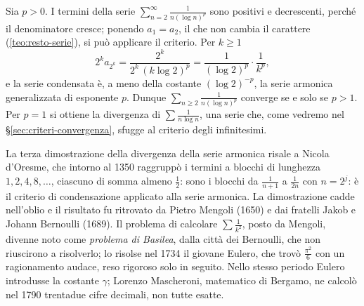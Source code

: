 \begin{esempio}\label{es:condensazione-log}
Sia $p>0$. I termini della serie $\sum_{n=2}^{\infty}\frac1{n(\log n)^{p}}$ sono positivi e
decrescenti, perché il denominatore cresce; ponendo $a_{1}=a_{2}$, il che non cambia il carattere (\cref{teo:resto-serie}),
si può applicare il criterio. Per $k\ge1$
\[
  2^{k}a_{2^{k}}=\frac{2^{k}}{2^{k}\,(k\log2)^{p}}=\frac1{(\log2)^{p}}\cdot\frac1{k^{p}} ,
\]
e la serie condensata è, a meno della costante $(\log2)^{-p}$, la serie armonica
generalizzata di esponente $p$. Dunque $\sum_{n\ge2}\frac1{n(\log n)^{p}}$ converge se e solo se
$p>1$. Per $p=1$ si ottiene la divergenza di $\sum\frac1{n\log n}$, una serie che, come
vedremo nel \S\ref{sec:criteri-convergenza}, sfugge al criterio degli infinitesimi.
\end{esempio}

\begin{notastorica}
La terza dimostrazione della divergenza della serie armonica risale a Nicola d'Oresme,
che intorno al 1350 raggruppò i termini a blocchi di lunghezza $1,2,4,8,\dots$, ciascuno di
somma almeno $\frac12$: sono i blocchi da $\frac1{n+1}$ a $\frac1{2n}$ con $n=2^{j}$: è il criterio di
condensazione applicato alla serie armonica. La dimostrazione cadde nell'oblio e il risultato fu ritrovato da Pietro
Mengoli (1650) e dai fratelli Jakob e Johann Bernoulli (1689). Il problema di calcolare
$\sum\frac1{k^{2}}$, posto da Mengoli, divenne noto come \emph{problema di Basilea}, dalla città
dei Bernoulli, che non riuscirono a risolverlo; lo risolse nel 1734 il giovane Eulero,
che trovò $\frac{\pi^{2}}6$ con un ragionamento audace, reso rigoroso solo in seguito. Nello
stesso periodo Eulero introdusse la costante $\gamma$; Lorenzo Mascheroni, matematico di
Bergamo, ne calcolò nel 1790 trentadue cifre decimali, non tutte esatte.
\end{notastorica}
